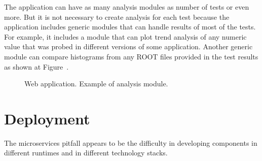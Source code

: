 \documentclass[10pt]{iopart}
\begin{document}
The application can have as many analysis modules as  number of tests or even
more. But it is not necessary to create analysis for each test because the
application includes generic modules that can handle results of most of the
tests. For example, it includes a module that can plot trend analysis of any
numeric value that was probed in different versions of some application. Another
generic module can compare histograms from any ROOT files provided in the
test results as  shown at Figure~.


\begin{figure}[H]
\centering
{}
\quad
{}
\label{figwebapp}
\caption{Web application. Example of analysis module.}
\end{figure}

\section{Deployment}
The microservices pitfall appears to be the difficulty in developing components in different runtimes and in
different technology stacks.
\end{document}
